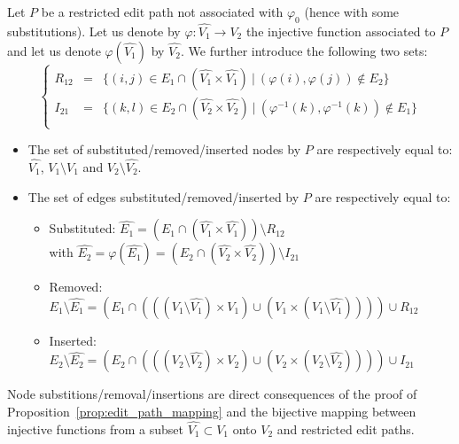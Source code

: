 \begin{proposition}\label{prop:defSRIsets}
  Let $P$ be a restricted edit path not associated with $\varphi_0$
  (hence with some substitutions). Let us denote by
  $\varphi: \hat{V_1}\rightarrow V_2$ the injective function
  associated to $P$ and let us denote $\varphi(\hat{V_1})$ by
  $\hat{V_2}$. We further introduce the following two sets:
  \[
  \left\{
    \begin{array}{lll}
      R_{12}&=&\{(i,j)\in E_1\cap(\hat{V_1}\times\hat{V_1})~|~(\varphi(i),\varphi(j))\not\in E_2\}\\
      I_{21}&=&\{(k,l)\in E_2\cap(\hat{V_2}\times\hat{V_2})~|~(\varphi^{-1}(k),\varphi^{-1}(k))\not\in E_1\}\\
    \end{array}
  \right.
  \]
  \begin{itemize}
  \item The set of substituted/removed/inserted nodes by $P$ are
    respectively equal to: $\hat{V_1}$, $V_1\setminus\hat{V_1}$ and
    $V_2\setminus\hat{V_2}$.
  \item The set of edges substituted/removed/inserted by $P$ are
    respectively equal to:
    \begin{itemize}
    \item Substituted: $\hat{E_1}=\left(E_1\cap (\hat{V_1}\times\hat{V_1})\right)\setminus R_{12}$\\
      with $\hat{E_2}=\varphi(\hat{E_1})=\left(E_2\cap (\hat{V_2}\times\hat{V_2})\right)\setminus I_{21}$
    \item Removed: $E_1\setminus\hat{E_1}=\left(E_1\cap\left(((V_1\setminus\hat{V_1})\times V_1)\cup ( V_1\times(V_1\setminus\hat{V_1}))\right)\right)\cup R_{12}$      
    \item Inserted: $E_2\setminus\hat{E_2}=\left(E_2\cap\left(((V_2\setminus\hat{V_2})\times V_2)\cup ( V_2\times(V_2\setminus\hat{V_2}))\right)\right)\cup I_{21}$
    \end{itemize}
  \end{itemize}
\end{proposition}
  Node substitions/removal/insertions are direct consequences of the
  proof of Proposition~\ref{prop:edit_path_mapping} and the bijective
  mapping between injective functions from a subset
  $\hat{V_1}\subset V_1$ onto $V_2$ and restricted edit paths. 
